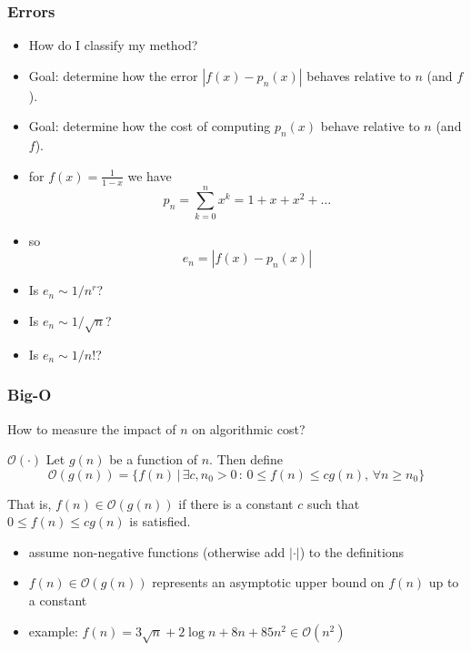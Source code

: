 \documentclass[10pt]{beamer}
\newcommand{\mO}{{\mathcal{O}}}
\begin{document}
\begin{frame}
\frametitle{Errors}
\begin{itemize}
  \item How do I classify my method?
  \item Goal: determine how the error $|f(x) - p_n(x)|$ behaves relative to $n$
(and $f$).
  \item Goal: determine how the cost of computing $p_n(x)$ behave relative to
$n$ (and $f$).
  \item for $f(x) = \frac{1}{1-x}$ we have
\[
  p_n = \sum_{k=0}^{n} x^k = 1 + x + x^2 + \dots
\]
  \item so
    \[
    e_n = |f(x) - p_n(x)|
\]
  \item Is $e_n \sim 1/n^{r}$?
  \item Is $e_n \sim 1/\sqrt{n}$?
  \item Is $e_n \sim 1/n!$?
\end{itemize}
\end{frame}
\begin{frame}
\frametitle{Big-O}
How to measure the impact of $n$ on algorithmic cost?
\begin{block}{$\mO(\cdot)$}
Let $g(n)$ be a function of $n$.  Then define
\begin{equation*}
  \mO(g(n)) = \{f(n)\,|\, \exists c,n_0>0 \,:\, 0\leq f(n)\leq cg(n),\, \forall
n\geq n_0\}
\end{equation*}

That is, $f(n)\in \mO(g(n))$ if there is a constant $c$ such that $0\leq f(n)
\leq cg(n)$ is satisfied.
\end{block}
\begin{itemize}
  \item assume non-negative functions (otherwise add $| \cdot |$) to the definitions
  \item $f(n)\in\mO(g(n))$ represents an asymptotic upper bound on $f(n)$ up to a constant
  \item example: $f(n) = 3\sqrt{n} + 2\log n + 8 n + 85 n^2 \in \mO(n^2)$
\end{itemize}
\end{frame}
\end{document}
